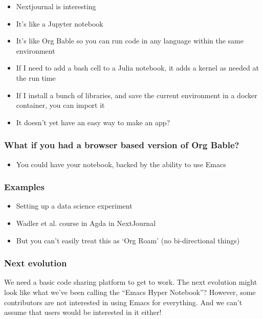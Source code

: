 \documentclass[11pt]{article}
\begin{document}
\begin{itemize}
\item Nextjournal is interesting
\item It's like a Jupyter notebook
\item It's like Org Bable so you can run code in any language within the same environment
\item If I need to add a bash cell to a Julia notebook, it adds a kernel as needed at the run time
\item If I install a bunch of libraries, and save the current environment in a docker container, you can import it
\item It doesn't yet have an easy way to make an app?
\end{itemize}

\subsubsection{What if you had a browser based version of Org Bable?}
\label{sec:org4ea7087}

\begin{itemize}
\item You could have your notebook, backed by the ability to use Emacs
\end{itemize}

\subsubsection{Examples}
\label{sec:org2219c26}

\begin{itemize}
\item Setting up a data science experiment
\item Wadler et al. course in Agda in NextJournal
\item But you can't easily treat this as ‘Org Roam’ (no bi-directional things)
\end{itemize}

\subsubsection{Next evolution}
\label{sec:orgd913405}

We need a basic code sharing platform to get to work.  The next
evolution might look like what we’ve been calling the “Emacs Hyper
Notebook”?  However, some contributors are not interested in using
Emacs for everything.  And we can’t assume that users would be
interested in it either!
\end{document}
